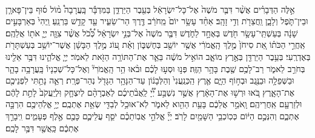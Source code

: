 \documentclass[twoside, openany, parskip=half, 11pt]{book}
\begin{document}
\begin{footnotesize}
\begin{multicols}{2}
\\
 אֵ֣לֶּה הַדְּבָרִ֗ים אֲשֶׁ֨ר דִּבֶּ֤ר מֹשֶׁה֙ אֶל־כָּל־יִשְׂרָאֵ֔ל בְּעֵ֖בֶר הַיַּרְדֵּ֑ן בַּמִּדְבָּ֡ר בָּֽעֲרָבָה֩ מ֨וֹל ס֜וּף בֵּין־פָּארָ֧ן וּבֵין־תֹּ֛פֶל וְלָבָ֑ן וַֽחֲצֵרֹ֖ת וְדִ֥י זָהָֽב׃ אַחַ֨ד עָשָׂ֥ר יוֹם֙ מֵֽחֹרֵ֔ב דֶּ֖רֶךְ הַר־שֵׂעִ֑יר עַ֖ד קָדֵ֥שׁ בַּרְנֵֽעַ׃ וַֽיְהִי֙ בְּאַרְבָּעִ֣ים שָׁנָ֔ה בְּעַשְׁתֵּֽי־עָשָׂ֥ר חֹ֖דֶשׁ בְּאֶחָ֣ד לַחֹ֑דֶשׁ דִּבֶּ֤ר מֹשֶׁה֙ אֶל־בְּנֵ֣י יִשְׂרָאֵ֔ל כְּ֠כֹ֠ל אֲשֶׁ֨ר צִוָּ֧ה יְיָ֛ אֹת֖וֹ אֲלֵהֶֽם׃  אַֽחֲרֵ֣י הַכֹּת֗וֹ אֵ֚ת סִיחֹן֙ מֶ֣לֶךְ הָֽאֱמֹרִ֔י אֲשֶׁ֥ר יוֹשֵׁ֖ב בְּחֶשְׁבּ֑וֹן וְאֵ֗ת ע֚וֹג מֶ֣לֶךְ הַבָּשָׁ֔ן אֲשֶׁר־יוֹשֵׁ֥ב בְּעַשְׁתָּרֹ֖ת בְּאֶדְרֶֽעִי׃ בְּעֵ֥בֶר הַיַּרְדֵּ֖ן בְּאֶ֣רֶץ מוֹאָ֑ב הוֹאִ֣יל מֹשֶׁ֔ה בֵּאֵ֛ר אֶת־הַתּוֹרָ֥ה הַזֹּ֖את לֵאמֹֽר׃ יְיָ֧ אֱלֹהֵ֛ינוּ דִּבֶּ֥ר אֵלֵ֖ינוּ בְּחֹרֵ֣ב לֵאמֹ֑ר רַב־לָכֶ֥ם שֶׁ֖בֶת בָּהָ֥ר הַזֶּֽה׃ פְּנ֣וּ וּסְע֣וּ לָכֶ֗ם וּבֹ֨אוּ הַ֥ר הָֽאֱמֹרִי֘ וְאֶל־כָּל־שְׁכֵנָיו֒ בָּֽעֲרָבָ֥ה בָהָ֛ר וּבַשְּׁפֵלָ֥ה וּבַנֶּ֖גֶב וּבְח֣וֹף הַיָּ֑ם אֶ֤רֶץ הַֽכְּנַֽעֲנִי֙ וְהַלְּבָנ֔וֹן עַד־הַנָּהָ֥ר הַגָּדֹ֖ל נְהַר־פְּרָֽת׃  רְאֵ֛ה נָתַ֥תִּי לִפְנֵיכֶ֖ם אֶת־הָאָ֑רֶץ בֹּ֚אוּ וּרְשׁ֣וּ אֶת־הָאָ֔רֶץ אֲשֶׁ֣ר נִשְׁבַּ֣ע יְ֠יָ֠ לַֽאֲבֹ֨תֵיכֶ֜ם לְאַבְרָהָ֨ם לְיִצְחָ֤ק וּֽלְיַֽעֲקֹב֙ לָתֵ֣ת לָהֶ֔ם וּלְזַרְעָ֖ם אַֽחֲרֵיהֶֽם׃ וָֽאֹמַ֣ר אֲלֵכֶ֔ם בָּעֵ֥ת הַהִ֖וא לֵאמֹ֑ר לֹֽא־אוּכַ֥ל לְבַדִּ֖י שְׂאֵ֥ת אֶתְכֶֽם׃ יְיָ֥ אֱלֹֽהֵיכֶ֖ם הִרְבָּ֣ה אֶתְכֶ֑ם וְהִנְּכֶ֣ם הַיּ֔וֹם כְּכֽוֹכְבֵ֥י הַשָּׁמַ֖יִם לָרֹֽב׃ יְיָ֞ אֱלֹהֵ֣י אֲבֽוֹתֵכֶ֗ם יֹסֵ֧ף עֲלֵיכֶ֛ם כָּכֶ֖ם אֶ֣לֶף פְּעָמִ֑ים וִֽיבָרֵ֣ךְ אֶתְכֶ֔ם כַּֽאֲשֶׁ֖ר דִּבֶּ֥ר לָכֶֽם׃


\end{multicols}
\end{footnotesize}
\end{document}
